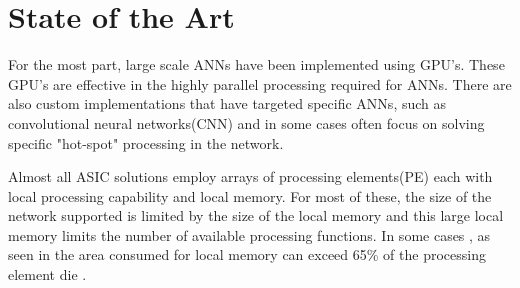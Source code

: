 
\chapter{State of the Art}
\label{chap-two}

For the most part, large scale ANNs have been implemented using GPU's.
These GPU's are effective in the highly parallel processing required for ANNs.
There are also custom implementations that have targeted specific ANNs\cite{chen201614}\cite{farabet2011neuflow}, 
such as convolutional neural networks(CNN) and in some cases often focus on
solving specific "hot-spot" processing in the network\cite{chen201614}.

Almost all ASIC solutions employ arrays of processing elements(PE) each with local processing capability and local memory.
For most of these, the size of the network supported is limited by the size of the local memory and this large
local memory limits the number of available processing functions. %
In some cases \iftrue, as seen in \fi the area consumed for local memory can exceed 65\% of the 
processing element die \cite{kim2016neurocube}\cite{chen2014diannao}.
